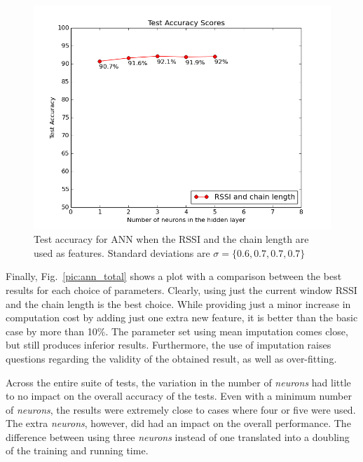 \begin{figure}[h]
	\begin{center}
		\includegraphics[scale=0.5]{figures/ann_chain.png}
	\end{center}
	
	\caption{Test accuracy for ANN when the RSSI and the chain length are used as features. Standard deviations are $\sigma=\lbrace 0.6,0.7,0.7,0.7 \rbrace $}
	\label{pic:ann_chain}

\end{figure}

Finally, Fig.~\ref{pic:ann_total} shows a plot with a comparison between the best results for each choice of parameters. Clearly, using just the current window RSSI and the chain length is the best choice. While providing just a minor increase in computation cost by adding just one extra new feature, it is better than the basic case by more than 10\%. The parameter set using mean imputation comes close, but still produces inferior results. Furthermore, the use of imputation raises questions regarding the validity of the obtained result, as well as over-fitting. 

Across the entire suite of tests, the variation in the number of \textit{neurons} had little to no impact on the overall accuracy of the tests. Even with a minimum number of \textit{neurons}, the results were extremely close to cases where four or five were used. The extra \textit{neurons}, however, did had an impact on the overall performance. The difference between using three \textit{neurons} instead of one translated into a doubling of the training and running time. 

